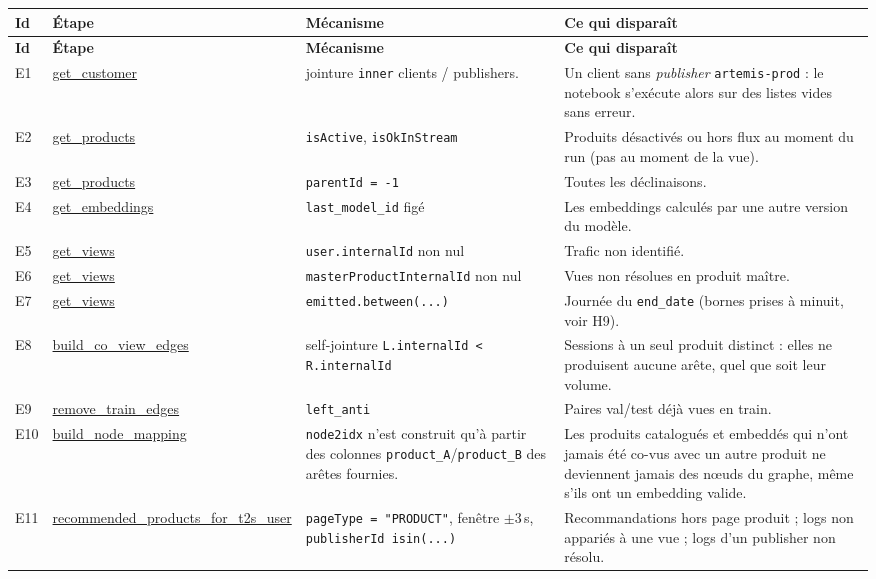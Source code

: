 \documentclass[11pt,a4paper]{article}
\newcommand{\code}[1]{\texttt{\small #1}}
\begin{document}
{\small
\begin{longtable}{@{}l p{3.2cm} p{4.4cm} p{5.2cm}@{}}
\toprule
\textbf{Id} & \textbf{Étape} & \textbf{Mécanisme} & \textbf{Ce qui disparaît} \\
\midrule
\endfirsthead
\toprule
\textbf{Id} & \textbf{Étape} & \textbf{Mécanisme} & \textbf{Ce qui disparaît} \\
\midrule
\endhead
\bottomrule
\endfoot

E1 & \url{get_customer} & jointure \code{inner} clients / publishers. & Un client sans \emph{publisher} \code{artemis-prod} : le notebook s'exécute alors sur des listes vides sans erreur. \\
\addlinespace
E2 & \url{get_products} & \code{isActive}, \code{isOkInStream} & Produits désactivés ou hors flux au moment du run (pas au moment de la vue). \\
\addlinespace
E3 & \url{get_products} & \code{parentId = -1} & Toutes les déclinaisons. \\
\addlinespace
E4 & \url{get_embeddings} & \code{last\_model\_id} figé & Les embeddings calculés par une autre version du modèle. \\
\addlinespace
E5 & \url{get_views} & \code{user.internalId} non nul & Trafic non identifié. \\
\addlinespace
E6 & \url{get_views} & \code{masterProductInternalId} non nul & Vues non résolues en produit maître. \\
\addlinespace
E7 & \url{get_views} & \code{emitted.between(...)} & Journée du \code{end\_date} (bornes prises à minuit, voir H9). \\
\addlinespace
E8 & \url{build_co_view_edges} & self-jointure \code{L.internalId < R.internalId} & Sessions à un seul produit distinct : elles ne produisent aucune arête, quel que soit leur volume. \\
\addlinespace
E9 & \url{remove_train_edges} & \code{left\_anti} & Paires val/test déjà vues en train. \\
\addlinespace
E10 & \url{build_node_mapping} & \code{node2idx} n'est construit qu'à partir des colonnes \code{product\_A}/\code{product\_B} des arêtes fournies. & Les produits catalogués et embeddés qui n'ont jamais été co-vus avec un autre produit ne deviennent jamais des nœuds du graphe, même s'ils ont un embedding valide. \\
\addlinespace
E11 & \url{recommended_products_for_t2s_user} & \code{pageType = "PRODUCT"}, fenêtre $\pm$3\,s, \code{publisherId isin(...)} & Recommandations hors page produit ; logs non appariés à une vue ; logs d'un publisher non résolu. \\

\end{longtable}}
\end{document}
